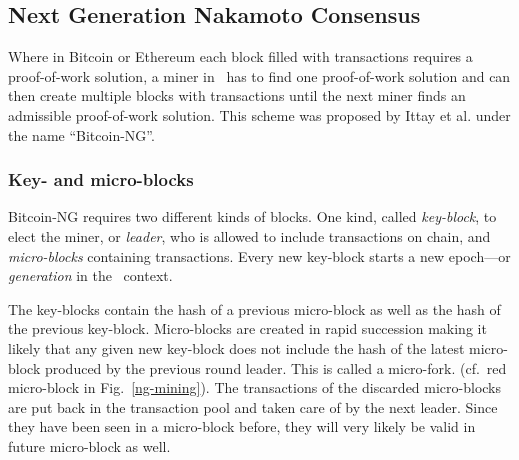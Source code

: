 
\subsection{Next Generation Nakamoto Consensus}

Where in Bitcoin or Ethereum each block filled with transactions requires
a proof-of-work solution, a miner in \aet\ has to find one proof-of-work
solution and can then create multiple blocks with transactions until the next
miner finds an admissible proof-of-work solution. This scheme was proposed by
Ittay et al. \cite{Eyal:2016:BSB:2930611.2930615} under the name
\enquote{Bitcoin-NG}.

\subsubsection{Key- and micro-blocks}

Bitcoin-NG requires two different kinds of blocks. One kind, called
\textit{key-block}, to elect the miner, or \textit{leader}, who is allowed to
include transactions on chain, and \textit{micro-blocks} containing
transactions. Every new key-block starts a new epoch---or \textit{generation}
in the \aet\ context.

The key-blocks contain the hash of a previous micro-block as well as the hash
of the previous key-block.
Micro-blocks are created in rapid succession making it likely that any
given new key-block does not include the hash of the latest micro-block
produced by the previous round leader.
This is called a micro-fork. (cf.\ red micro-block in Fig.\
\ref{ng-mining}). The transactions of the discarded micro-blocks are put back
in the transaction pool and taken care of by the next leader. Since they have
been seen in a micro-block before, they will very likely be valid in
future micro-block as well.

